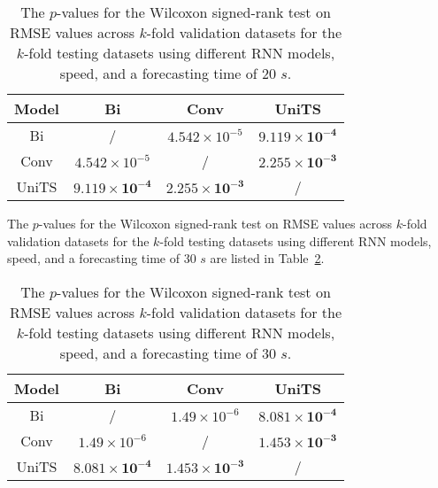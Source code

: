 \begin{table}[!ht]
	\centering
	\begin{tabular}{|c|c|c|c|}
		\hline
		Model & Bi & Conv & UniTS \\ \hline
		Bi & / & $4.542 \times 10^{-5}$ & $\mathbf{9.119 \times 10^{-4}}$ \\ \hline
		Conv & $4.542 \times 10^{-5}$ & / & $\mathbf{2.255 \times 10^{-3}}$ \\ \hline
		UniTS & $\mathbf{9.119 \times 10^{-4}}$ & $\mathbf{2.255 \times 10^{-3}}$ & / \\ \hline
	\end{tabular}
	\caption{The $p$-values for the Wilcoxon signed-rank test on RMSE values across $k$-fold validation datasets for the $k$-fold testing datasets using different RNN models, speed, and a forecasting time of $20$ $s$.}
	\label{tab:RMSE:speed:p:20}
\end{table}

The $p$-values for the Wilcoxon signed-rank test on RMSE values across $k$-fold validation datasets for the $k$-fold testing datasets using different RNN models, speed, and a forecasting time of $30$ $s$ are listed in Table~\ref{tab:RMSE:speed:p:30}.

\begin{table}[!ht]
	\centering
	\begin{tabular}{|c|c|c|c|}
		\hline
		Model & Bi & Conv & UniTS \\ \hline
		Bi & / & $1.49 \times 10^{-6}$ & $\mathbf{8.081 \times 10^{-4}}$ \\ \hline
		Conv & $1.49 \times 10^{-6}$ & / & $\mathbf{1.453 \times 10^{-3}}$ \\ \hline
		UniTS & $\mathbf{8.081 \times 10^{-4}}$ & $\mathbf{1.453 \times 10^{-3}}$ & / \\ \hline
	\end{tabular}
	\caption{The $p$-values for the Wilcoxon signed-rank test on RMSE values across $k$-fold validation datasets for the $k$-fold testing datasets using different RNN models, speed, and a forecasting time of $30$ $s$.}
	\label{tab:RMSE:speed:p:30}
\end{table}

